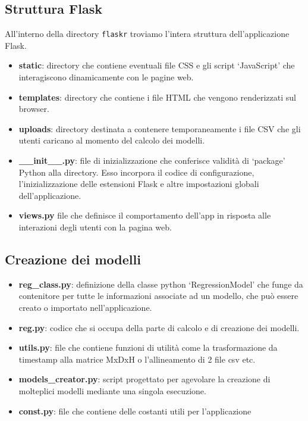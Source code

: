 \documentclass[a4paper,10pt]{article}
\begin{document}
\subsection{Struttura Flask}
All'interno della directory \texttt{flaskr} troviamo l'intera struttura dell'applicazione Flask.
\begin{itemize}
  \item \textbf{static}: directory che contiene eventuali file CSS e gli script `JavaScript' che interagiscono dinamicamente con le pagine web.
  \item \textbf{templates}: directory che contiene i file HTML che vengono renderizzati sul browser.
  \item \textbf{uploads}: directory destinata a contenere temporaneamente i file CSV che gli utenti caricano al momento del calcolo dei modelli.
  \item \textbf{\_\_init\_\_.py}: file di inizializzazione che conferisce validità di `package' Python alla directory. 
  Esso incorpora il codice di configurazione, l'inizializzazione delle estensioni Flask e altre impostazioni globali dell'applicazione.
  \item \textbf{views.py} file che definisce il comportamento dell'app in risposta alle interazioni degli utenti con la pagina web.
\end{itemize}

\subsection{Creazione dei modelli}
\begin{itemize}
  \item \textbf{reg\_class.py}: definizione della classe python `RegressionModel' che funge da contenitore per tutte le
  informazioni associate ad un modello, che può essere creato o importato nell'applicazione.
  \item \textbf{reg.py}: codice che si occupa della parte di calcolo e di creazione dei modelli.
  \item \textbf{utils.py}: file che contiene funzioni di utilità come la trasformazione da timestamp alla matrice MxDxH o l'allineamento di 2 file csv etc.
  \item \textbf{models\_creator.py}: script progettato per agevolare la creazione di molteplici modelli mediante una singola esecuzione.
  \item \textbf{const.py}: file che contiene delle costanti utili per l'applicazione
\end{itemize}
\end{document}
